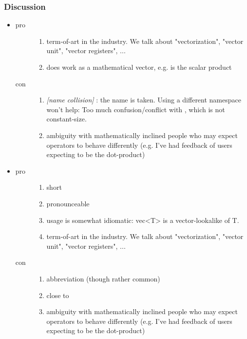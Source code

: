 \subsubsection{Discussion}

\begin{itemize}
  \item {}
    \begin{description}
      \item[pro]
        \begin{enumerate}
          \item term-of-art in the industry. We talk about "vectorization", "vector unit", "vector registers", ...
          \item does work as a mathematical vector, e.g.  is the scalar product
        \end{enumerate}
      \item[con]
        \begin{enumerate}
          \item \emph{[name collision]} : the name is taken. Using a different namespace won't help: Too much confusion/conflict with , which is not constant-size.
          \item ambiguity with mathematically inclined people who may expect operators to behave differently (e.g. I've had feedback of users expecting  to be the dot-product)
        \end{enumerate}
    \end{description}

  \item {}
    \begin{description}
      \item[pro]
        \begin{enumerate}
          \item short
          \item pronounceable
          \item usage is somewhat idiomatic: vec<T> is a vector-lookalike of T.
          \item term-of-art in the industry. We talk about "vectorization", "vector unit", "vector registers", ...
        \end{enumerate}
      \item[con]
        \begin{enumerate}
          \item abbreviation (though rather common)
          \item close to 
          \item ambiguity with mathematically inclined people who may expect operators to behave differently (e.g. I've had feedback of users expecting  to be the dot-product)
        \end{enumerate}
    \end{description}


\end{itemize}
